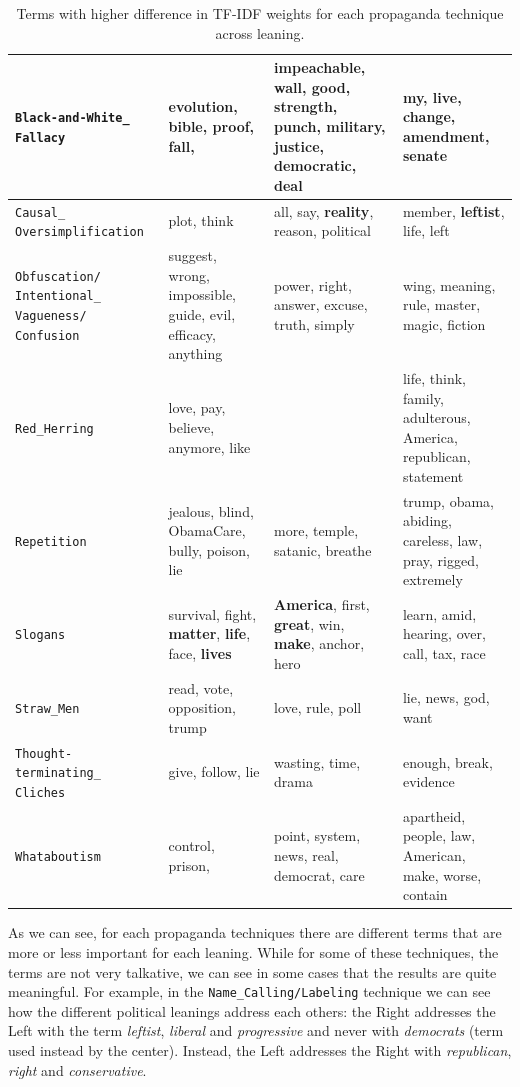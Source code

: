 \begin{table}[!htbp]
{\begin{tabular}{p{}|p{}|p{}|p{}}
         \hline
         \texttt{Black-and-White\_ Fallacy} & evolution, bible, proof, fall,  & impeachable, wall, good, strength, punch, military, justice, democratic, deal & my, live, change, amendment, senate \\
         \hline
         \texttt{Causal\_ Oversimplification} & plot, think & all, say, \textbf{reality}, reason, political & member, \textbf{leftist}, life, left  \\
         \hline
         \texttt{Obfuscation/ Intentional\_ Vagueness/ Confusion} & suggest, wrong, impossible, guide, evil, efficacy, anything & power, right, answer, excuse, truth, simply  & wing, meaning, rule, master, magic, fiction \\
         \hline
         \texttt{Red\_Herring} & love, pay, believe, anymore, like & & life, think, family, adulterous, America, republican, statement  \\
         \hline
         \texttt{Repetition} & jealous, blind, ObamaCare, bully, poison, lie  & more, temple, satanic, breathe & trump, obama, abiding, careless, law, pray, rigged, extremely  \\
         \hline
         \texttt{Slogans} & survival, fight, \textbf{matter}, \textbf{life}, face, \textbf{lives} & \textbf{America}, first, \textbf{great}, win, \textbf{make}, anchor, hero  & learn, amid, hearing, over, call, tax, race  \\
         \hline
         \texttt{Straw\_Men} & read, vote, opposition, trump & love, rule, poll & lie, news, god, want \\
         \hline
         \texttt{Thought-terminating\_ Cliches} & give, follow, lie  & wasting, time, drama & enough, break, evidence \\
         \hline
         \texttt{Whataboutism} & control, prison, & point, system, news, real, democrat, care  & apartheid, people, law, American, make, worse, contain \\
    \end{tabular}
}
    \caption{Terms with higher difference in TF-IDF weights for each propaganda technique across leaning.}
    \label{tab:prop_words_by_technique_and_leaning}
\end{table}

As we can see, for each propaganda techniques there are different terms that are more or less important for each leaning. While for some of these techniques, the terms are not very talkative, we can see in some cases that the results are quite meaningful.
For example, in the \texttt{Name\_Calling/Labeling} technique we can see how the different political leanings address each others: the Right addresses the Left with the term \emph{leftist}, \emph{liberal} and \emph{progressive} and never with \emph{democrats} (term used instead by the center). Instead, the Left addresses the Right with \emph{republican}, \emph{right} and \emph{conservative}.

